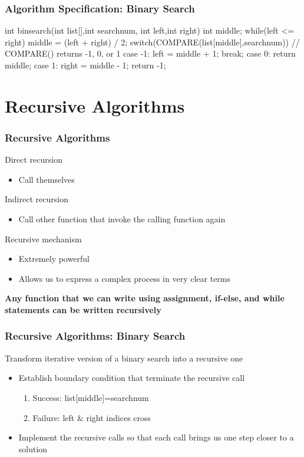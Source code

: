\documentclass[newPxFont,sthlmFooter,nooffset]{beamer}
\begin{document}
\begin{frame}[t, fragile]
  \frametitle{Algorithm Specification: Binary Search}
\begin{codedef}
int binsearch(int list[],int searchnum,
                        int left,int right) {
   int middle;
   while(left <= right) {
      middle = (left + right) / 2; 
      switch(COMPARE(list[middle],searchnum)) { 
         // COMPARE() returns -1, 0, or 1
         case -1: left = middle + 1;
                  break;
         case  0: return middle;
         case  1: right = middle - 1;
      }
   }
   return -1; 
}
\end{codedef}
\end{frame}

\section{Recursive Algorithms}
\begin{frame}[t]
  \frametitle{Recursive Algorithms}
Direct recursion
\begin{itemize}
\item Call themselves
\end{itemize}

Indirect recursion
\begin{itemize}
\item Call other function that invoke the calling function again
\end{itemize}

Recursive mechanism
\begin{itemize}
\item Extremely powerful
\item Allows us to express a complex process in very clear terms
\end{itemize}

\textbf{Any function that we can write using assignment, if-else, and while statements can be written recursively}
\end{frame}

\begin{frame}[t]
  \frametitle{Recursive Algorithms: Binary Search}
Transform iterative version of a binary search into a recursive one
\begin{itemize}
\item Establish boundary condition that terminate the recursive call
  \begin{enumerate}
  \item Success: list[middle]=searchnum
  \item Failure: left $\&$ right indices cross
  \end{enumerate}
\item Implement the recursive calls so that each call brings us one
  step closer to a solution
\end{itemize}
\end{frame}
\end{document}
